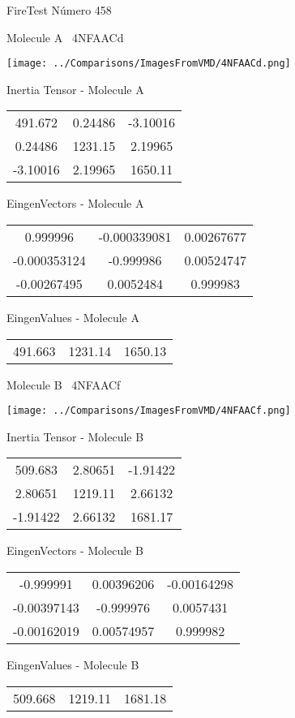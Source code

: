 \vtab[-3cm]
\begin{center}
{\large FireTest \tab Número 458}
\end{center}
\begin{multicols}{2}
\begin{center}

Molecule A \
4NFAACd

\texttt{[image: ../Comparisons/ImagesFromVMD/4NFAACd.png]}

Inertia Tensor - Molecule A \\
\begin{tabular}{|c c c|}
491.672	 & 	0.24486	 & 	-3.10016	 \\
0.24486	 & 	1231.15	 & 	2.19965	 \\
-3.10016	 & 	2.19965	 & 	1650.11
\end{tabular}

\vtab
 EingenVectors - Molecule A     \\
\begin{tabular}{|c c c|}
0.999996	 & 	-0.000339081	 & 	0.00267677	 \\
-0.000353124	 & 	-0.999986	 & 	0.00524747	 \\
-0.00267495	 & 	0.0052484	 & 	0.999983
\end{tabular}

\vtab
 EingenValues - Molecule A     \\
\begin{tabular}{|c c c|}
491.663	 & 	1231.14	 & 	1650.13	 \\
\end{tabular}
\columnbreak

Molecule B \
4NFAACf

\texttt{[image: ../Comparisons/ImagesFromVMD/4NFAACf.png]}

Inertia Tensor - Molecule B \\
\begin{tabular}{|c c c|}
509.683	 & 	2.80651	 & 	-1.91422	 \\
2.80651	 & 	1219.11	 & 	2.66132	 \\
-1.91422	 & 	2.66132	 & 	1681.17
\end{tabular}

\vtab
 EingenVectors - Molecule B     \\
\begin{tabular}{|c c c|}
-0.999991	 & 	0.00396206	 & 	-0.00164298	 \\
-0.00397143	 & 	-0.999976	 & 	0.0057431	 \\
-0.00162019	 & 	0.00574957	 & 	0.999982
\end{tabular}

\vtab
 EingenValues - Molecule B     \\
\begin{tabular}{|c c c|}
509.668	 & 	1219.11	 & 	1681.18	 \\
\end{tabular}

\end{center}
\end{multicols}

